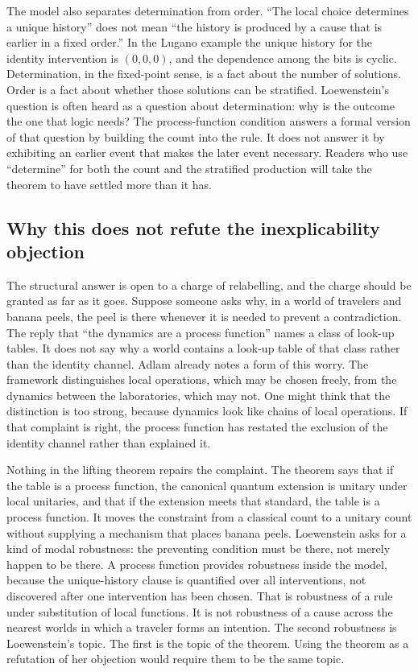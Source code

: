 \documentclass[11pt]{article}
\begin{document}
The model also separates determination from order. ``The local choice determines a unique history'' does not mean ``the history is produced by a cause that is earlier in a fixed order.'' In the Lugano example the unique history for the identity intervention is \((0,0,0)\), and the dependence among the bits is cyclic. Determination, in the fixed-point sense, is a fact about the number of solutions. Order is a fact about whether those solutions can be stratified. Loewenstein's question is often heard as a question about determination: why is the outcome the one that logic needs? The process-function condition answers a formal version of that question by building the count into the rule. It does not answer it by exhibiting an earlier event that makes the later event necessary. Readers who use ``determine'' for both the count and the stratified production will take the theorem to have settled more than it has.

\subsection{Why this does not refute the inexplicability objection}
\label{sec:notrefute}

The structural answer is open to a charge of relabelling, and the charge should be granted as far as it goes. Suppose someone asks why, in a world of travelers and banana peels, the peel is there whenever it is needed to prevent a contradiction. The reply that ``the dynamics are a process function'' names a class of look-up tables. It does not say why a world contains a look-up table of that class rather than the identity channel. Adlam already notes a form of this worry. The framework distinguishes local operations, which may be chosen freely, from the dynamics between the laboratories, which may not. One might think that the distinction is too strong, because dynamics look like chains of local operations. If that complaint is right, the process function has restated the exclusion of the identity channel rather than explained it.

Nothing in the lifting theorem repairs the complaint. The theorem says that if the table is a process function, the canonical quantum extension is unitary under local unitaries, and that if the extension meets that standard, the table is a process function. It moves the constraint from a classical count to a unitary count without supplying a mechanism that places banana peels. Loewenstein asks for a kind of modal robustness: the preventing condition must be there, not merely happen to be there. A process function provides robustness inside the model, because the unique-history clause is quantified over all interventions, not discovered after one intervention has been chosen. That is robustness of a rule under substitution of local functions. It is not robustness of a cause across the nearest worlds in which a traveler forms an intention. The second robustness is Loewenstein's topic. The first is the topic of the theorem. Using the theorem as a refutation of her objection would require them to be the same topic.
\end{document}
